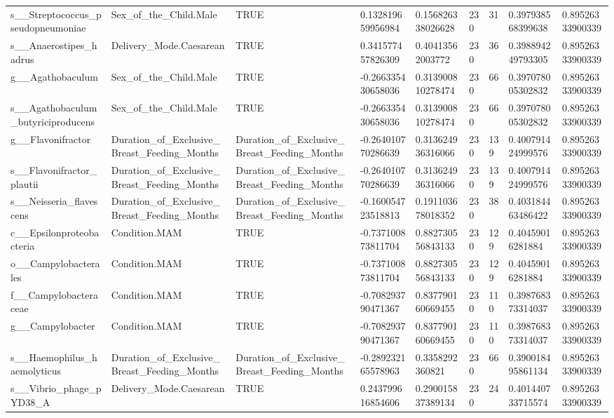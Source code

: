 \begin{longtable}{lllllllll}
s\_\_Streptococcus\_pseudopneumoniae & Sex\_of\_the\_Child.Male & TRUE & 0.132819659956984 & 0.156826338026628 & 230 & 31 & 0.397938568399638 & 0.89526333900339 \\
s\_\_Anaerostipes\_hadrus & Delivery\_Mode.Caesarean & TRUE & 0.341577457826309 & 0.40413562003772 & 230 & 36 & 0.398894249793305 & 0.89526333900339 \\
g\_\_Agathobaculum & Sex\_of\_the\_Child.Male & TRUE & -0.266335430658036 & 0.313900810278474 & 230 & 66 & 0.397078005302832 & 0.89526333900339 \\
s\_\_Agathobaculum\_butyriciproducens & Sex\_of\_the\_Child.Male & TRUE & -0.266335430658036 & 0.313900810278474 & 230 & 66 & 0.397078005302832 & 0.89526333900339 \\
g\_\_Flavonifractor & Duration\_of\_Exclusive\_Breast\_Feeding\_Months & Duration\_of\_Exclusive\_Breast\_Feeding\_Months & -0.264010770286639 & 0.313624936316066 & 230 & 139 & 0.400791424999576 & 0.89526333900339 \\
s\_\_Flavonifractor\_plautii & Duration\_of\_Exclusive\_Breast\_Feeding\_Months & Duration\_of\_Exclusive\_Breast\_Feeding\_Months & -0.264010770286639 & 0.313624936316066 & 230 & 139 & 0.400791424999576 & 0.89526333900339 \\
s\_\_Neisseria\_flavescens & Duration\_of\_Exclusive\_Breast\_Feeding\_Months & Duration\_of\_Exclusive\_Breast\_Feeding\_Months & -0.160054723518813 & 0.191103678018352 & 230 & 38 & 0.403184463486422 & 0.89526333900339 \\
c\_\_Epsilonproteobacteria & Condition.MAM & TRUE & -0.737100873811704 & 0.882730556843133 & 230 & 129 & 0.40459016281884 & 0.89526333900339 \\
o\_\_Campylobacterales & Condition.MAM & TRUE & -0.737100873811704 & 0.882730556843133 & 230 & 129 & 0.40459016281884 & 0.89526333900339 \\
f\_\_Campylobacteraceae & Condition.MAM & TRUE & -0.708293790471367 & 0.837790160669455 & 230 & 110 & 0.398768373314037 & 0.89526333900339 \\
g\_\_Campylobacter & Condition.MAM & TRUE & -0.708293790471367 & 0.837790160669455 & 230 & 110 & 0.398768373314037 & 0.89526333900339 \\
s\_\_Haemophilus\_haemolyticus & Duration\_of\_Exclusive\_Breast\_Feeding\_Months & Duration\_of\_Exclusive\_Breast\_Feeding\_Months & -0.289232165578963 & 0.3358292360821 & 230 & 66 & 0.390018495861134 & 0.89526333900339 \\
s\_\_Vibrio\_phage\_pYD38\_A & Delivery\_Mode.Caesarean & TRUE & 0.243799616854606 & 0.290015837389134 & 230 & 24 & 0.401440733715574 & 0.89526333900339 \\

\end{longtable}
